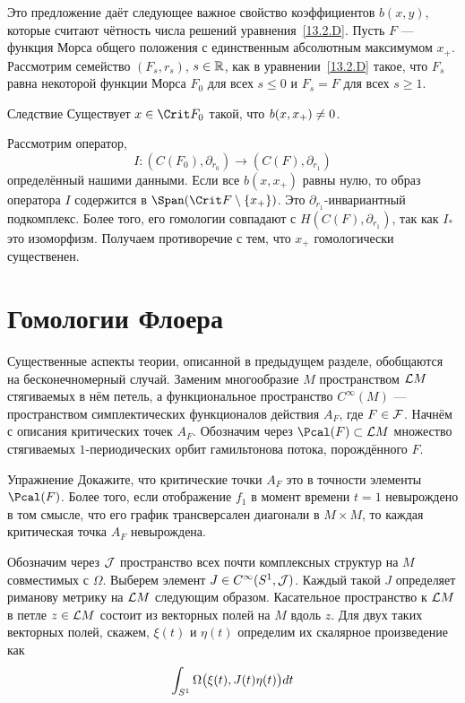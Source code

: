 Это предложение даёт следующее важное свойство коэффициентов $b(x,
y)$, которые считают чётность числа решений
уравнения~\ref{13.2.D}. 
Пусть $F$ — функция Морса общего положения с единственным абсолютным
максимумом $x_{+}$.
Рассмотрим семейство $(F_{s},r_{s})$, $s\in\mathbb{R}$, как в
уравнении~\ref{13.2.D} такое, что $F_{s}$ равна некоторой функции
Морса $F_{0}$ для всех $s\le0$ и $F_{s} = F$ для всех $s\ge1$.


\begin{thm}{Следствие}\label{13.2.H}
  Существует $x\in\Crit F_{0}$ такой, что $b(x, x_{+})\z\neq0$.  
\end{thm}

Рассмотрим оператор,
\[
I:(C(F_{0}),\partial_{r_{0}})\to (C(F),\partial_{r_{1}})
\]
определённый нашими данными.
Если все $b(x,x_{+})$ равны нулю, то образ оператора $I$ содержится в
$\Span(\Crit F\setminus\{x_{+}\})$. 
Это $\partial_{r_{1}}$-ин\-ва\-ри\-ант\-ный подкомплекс.
Более того, его гомологии совпадают с $H(C(F),\partial_{r_{1}})$,
так как $I_{*}$ это изоморфизм.
Получаем противоречие с тем, что $x_{+}$ гомологически существенен.
\qeds

\section{Гомологии Флоера}\label{13.3}
Существенные аспекты теории, описанной в предыдущем разделе,
обобщаются на бесконечномерный случай.
Заменим многообразие $M$ пространством $\mathcal{L} M$ стягиваемых в нём
петель, а функциональное пространство $C^{\infty}(M)$ — пространством
симплектических функционалов действия $A_{F}$, где $F\in\mathcal{F}$. 
Начнём с описания критических точек $A_{F}$.
Обозначим через $\Pcal(F)\subset\L M$ множество стягиваемых
$1$-периодических орбит гамильтонова потока, порождённого $F$.

\begin{ex}{Упражнение}\label{13.3.A}
Докажите, что критические точки $A_{F}$ это в точности элементы $\Pcal(F)$.
Более того, если отображение $f_{1}$ в момент времени $t=1$
невырождено в том смысле, что его график трансверсален диагонали в
$M\times M$, то каждая критическая точка $A_{F}$ невырождена. 
\end{ex}

Обозначим через $\mathcal{J}$ пространство всех почти комплексных структур
на $M$ совместимых с $\Omega$.
Выберем элемент $J\in C^{\infty}(S^{1},\mathcal{J})$.
Каждый такой $J$ определяет риманову метрику на $\mathcal{L} M$ следующим образом.
Касательное пространство к $\mathcal{L} M$ в петле $z\in\mathcal{L} M$
состоит из
векторных полей на $M$ вдоль $z$. 
Для двух таких векторных полей, скажем, $\xi(t)$ и $\eta(t)$ определим
их скалярное произведение как 
\[
\int_{S^{1}}\Omega\big(\xi(t),J(t)\eta(t)\big)d t
\]

